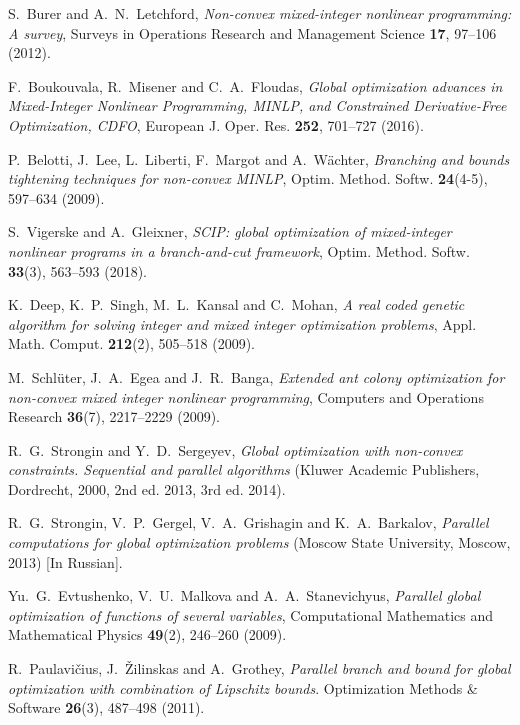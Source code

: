 \documentclass[
11pt,%
tightenlines,%
twoside,%
onecolumn,%
nofloats,%
nobibnotes,%
nofootinbib,%
superscriptaddress,%
noshowpacs,%
centertags]%
{revtex4}
\begin{document}
\begin{thebibliography}{99}

S.~Burer and A.~N.~Letchford, \textit{Non-convex mixed-integer nonlinear programming: A survey}, Surveys in Operations Research and Management Science \textbf{17}, 97--106 (2012).

F.~Boukouvala, R.~Misener and C.~A.~Floudas, \textit{Global optimization advances in Mixed-Integer Nonlinear Programming, MINLP, and Constrained Derivative-Free Optimization, CDFO}, European J. Oper. Res. \textbf{252}, 701--727 (2016).

P.~Belotti, J.~Lee, L.~Liberti, F.~Margot and A.~W\"achter, \textit{Branching and bounds tightening techniques for non-convex MINLP}, Optim. Method. Softw. \textbf{24}(4-5), 597--634 (2009).

S.~Vigerske and A.~Gleixner, \textit{SCIP: global optimization of mixed-integer nonlinear programs in a branch-and-cut framework}, Optim. Method. Softw. \textbf{33}(3), 563--593 (2018).

K.~Deep, K.~P.~Singh, M.~L.~Kansal and C.~Mohan, \textit{A real coded genetic algorithm for solving integer and mixed integer optimization problems}, Appl. Math. Comput. \textbf{212}(2), 505--518 (2009).

M.~Schl\"uter, J.~A.~Egea and J.~R.~Banga, \textit{Extended ant colony optimization for non-convex mixed integer nonlinear programming}, Computers and Operations Research \textbf{36}(7), 2217--2229 (2009).

R.~G.~Strongin and Y.~D.~Sergeyev, \textit{Global optimization with non-convex constraints. Sequential and parallel algorithms} (Kluwer Academic Publishers, Dordrecht, 2000, 2nd ed. 2013, 3rd ed. 2014).

R.~G.~Strongin, V.~P.~Gergel, V.~A.~Grishagin and K.~A.~Barkalov, \textit{Parallel computations for global optimization problems} (Moscow State University, Moscow, 2013) [In Russian].

Yu.~G.~Evtushenko, V.~U.~Malkova and A.~A.~Stanevichyus, \textit{Parallel global optimization of functions of several variables}, Computational Mathematics and Mathematical Physics \textbf{49}(2), 246--260 (2009).

R.~Paulavi\v{c}ius, J.~\v{Z}ilinskas and A.~Grothey, \textit{Parallel branch and bound for global optimization with combination of Lipschitz bounds}. Optimization Methods \& Software \textbf{26}(3), 487--498 (2011).


\end{thebibliography}
\end{document}
